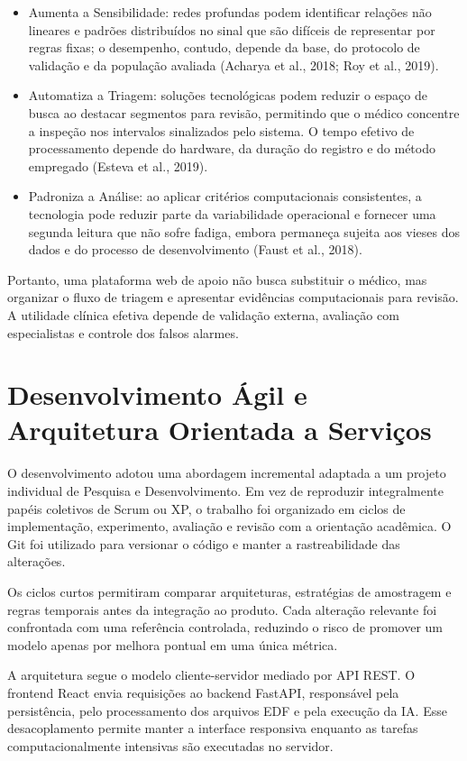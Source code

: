 \begin{itemize}[leftmargin=1.25cm,itemsep=0pt,topsep=0pt]
\item Aumenta a Sensibilidade: redes profundas podem identificar relações não lineares e padrões distribuídos no sinal que são difíceis de representar por regras fixas; o desempenho, contudo, depende da base, do protocolo de validação e da população avaliada (Acharya et al., 2018; Roy et al., 2019).
\item Automatiza a Triagem: soluções tecnológicas podem reduzir o espaço de busca ao destacar segmentos para revisão, permitindo que o médico concentre a inspeção nos intervalos sinalizados pelo sistema. O tempo efetivo de processamento depende do hardware, da duração do registro e do método empregado (Esteva et al., 2019).
\item Padroniza a Análise: ao aplicar critérios computacionais consistentes, a tecnologia pode reduzir parte da variabilidade operacional e fornecer uma segunda leitura que não sofre fadiga, embora permaneça sujeita aos vieses dos dados e do processo de desenvolvimento (Faust et al., 2018).
\end{itemize}
Portanto, uma plataforma web de apoio não busca substituir o médico, mas organizar o fluxo de triagem e apresentar evidências computacionais para revisão. A utilidade clínica efetiva depende de validação externa, avaliação com especialistas e controle dos falsos alarmes.

\section{Desenvolvimento Ágil e Arquitetura Orientada a Serviços}
O desenvolvimento adotou uma abordagem incremental adaptada a um projeto individual de Pesquisa e Desenvolvimento. Em vez de reproduzir integralmente papéis coletivos de Scrum ou XP, o trabalho foi organizado em ciclos de implementação, experimento, avaliação e revisão com a orientação acadêmica. O Git foi utilizado para versionar o código e manter a rastreabilidade das alterações.

Os ciclos curtos permitiram comparar arquiteturas, estratégias de amostragem e regras temporais antes da integração ao produto. Cada alteração relevante foi confrontada com uma referência controlada, reduzindo o risco de promover um modelo apenas por melhora pontual em uma única métrica.

A arquitetura segue o modelo cliente-servidor mediado por API REST. O frontend React envia requisições ao backend FastAPI, responsável pela persistência, pelo processamento dos arquivos EDF e pela execução da IA. Esse desacoplamento permite manter a interface responsiva enquanto as tarefas computacionalmente intensivas são executadas no servidor.

